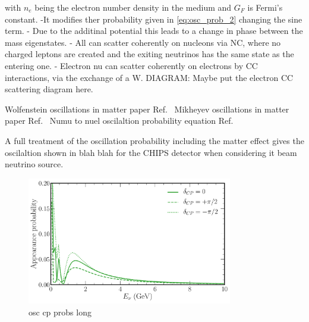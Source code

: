 with $n_{e}$ being the electron number density in the medium and $G_{F}$ is Fermi's constant.
-It modifies ther probability given in \ref{eq:osc_prob_2} changing the sine term.
- Due to the additinal potential this leads to a change in phase between the mass eigenstates.
- All can scatter coherently on nucleons via NC, where no charged leptons are created and the
exiting neutrinos has the same state as the entering one.
- Electron nu can scatter coherently on electrons by CC interactions, via the exchange of a W.
DIAGRAM: Maybe put the electron CC scattering diagram here.


Wolfenstein oscillations in matter paper Ref.~\cite{wolfenstein1978}
Mikheyev oscillations in matter paper Ref.~\cite{mikheev1986}
Numu to nuel oscilaltion probability equation Ref.~\cite{cervera2000}

A full treatment of the oscillation probability including the matter effect gives the
oscilaltion shown in blah blah for the CHIPS detector when considering it beam neutrino source.
\begin{figure} %
    \includegraphics[origin=c,width=0.8\textwidth]{diagrams/3-theory/explore_osc_cp_probs.pdf}
    \caption[osc cp probs short]
    {osc cp probs long}
    \label{fig:osc_cp_probs}
\end{figure} %




